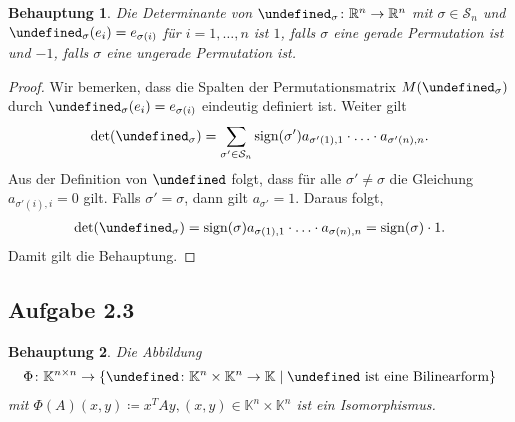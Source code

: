 \documentclass[draft,a5paper]{article}
\newtheorem*{beh}{Behauptung}
\let\phi\undefined
\newcommand{\phi}{\varphi}
\DeclareMathOperator{\sign}{sign}
\begin{document}
\begin{beh}
  Die Determinante von \(\phi_{\sigma} \colon \mathbb{R}^{n} \to \mathbb{R}^{n}\) mit \(\sigma \in \mathcal{S}_{n}\) und
  \(\phi_{\sigma}(e_{i}) = e_{\sigma(i)}\) für \(i = 1, \ldots, n\) ist \(1\), falls
  \(\sigma\) eine gerade Permutation ist und \(-1\), falls \(\sigma\) eine
  ungerade Permutation ist.
\end{beh}

\begin{proof}
  Wir bemerken, dass die Spalten der Permutationsmatrix \(M(\phi_{\sigma})\)
  durch \(\phi_{\sigma}(e_{i}) = e_{\sigma(i)}\) eindeutig definiert ist.  Weiter
  gilt
  \begin{align*}
    \det(\phi_{\sigma}) = \sum_{\sigma' \in \mathcal{S}_{n}}{\sign(\sigma')a_{\sigma'(1),1} \cdot \ldots \cdot a_{\sigma'(n),n}}.
  \end{align*}
  Aus der Definition von \(\phi\) folgt, dass für alle
  \(\sigma' \ne \sigma\) die Gleichung \(a_{\sigma'(i),i} = 0\) gilt.  Falls
  \(\sigma' = \sigma\), dann gilt \(a_{\sigma'} = 1\). Daraus folgt,
  \begin{align*}
    \det(\phi_{\sigma}) = \sign(\sigma)a_{\sigma(1),1} \cdot \ldots \cdot a_{\sigma(n),n} = \sign(\sigma) \cdot 1.
  \end{align*}
  Damit gilt die Behauptung.
\end{proof}

\subsection*{Aufgabe 2.3}

\begin{beh}
  Die Abbildung
  \begin{align*}
    \Phi \colon \mathbb{K}^{n \times n} \to \{\phi \colon \mathbb{K}^{n} \times \mathbb{K}^{n} \to \mathbb{K} \mid \phi \text{ ist eine
    Bilinearform}\}
  \end{align*}
  mit \(\Phi(A)(x,y) \coloneq x^{T}Ay, (x, y) \in \mathbb{K}^{n} \times \mathbb{K}^{n}\)
  ist ein Isomorphismus.
\end{beh}
\end{document}
